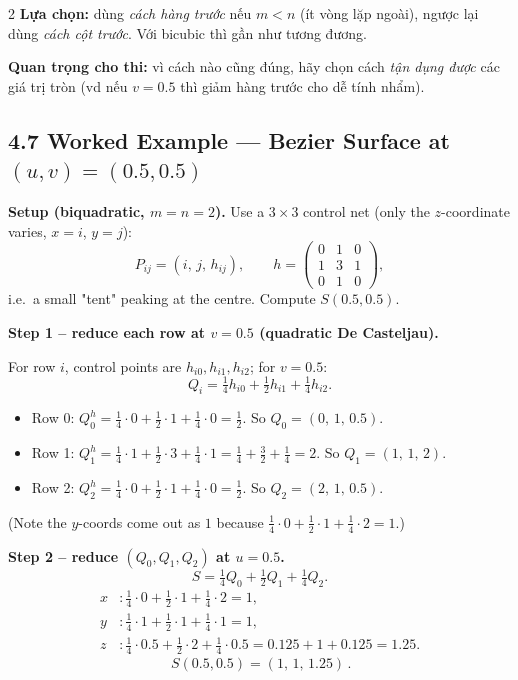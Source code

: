 \begin{paracol}{2}
\medskip
\textbf{Lựa chọn:} dùng \emph{cách hàng trước} nếu $m<n$ (ít vòng lặp ngoài), ngược lại dùng \emph{cách cột trước}. Với bicubic thì gần như tương đương.

\medskip
\textbf{Quan trọng cho thi:} vì cách nào cũng đúng, hãy chọn cách \emph{tận dụng được} các giá trị tròn (vd nếu $v=0.5$ thì giảm hàng trước cho dễ tính nhẩm).

\switchcolumn*

\subsection*{4.7 Worked Example --- Bezier Surface at $(u,v)=(0.5,0.5)$}

\textbf{Setup (biquadratic, $m=n=2$).} Use a $3\times 3$ control net (only the $z$-coordinate varies, $x=i$, $y=j$):
\[
P_{ij}=(i,\,j,\,h_{ij}),\qquad h=\begin{pmatrix}0&1&0\\1&3&1\\0&1&0\end{pmatrix},
\]
i.e.\ a small "tent" peaking at the centre. Compute $S(0.5,0.5)$.

\medskip
\textbf{Step 1 -- reduce each row at $v=0.5$ (quadratic De Casteljau).}

For row $i$, control points are $h_{i0},h_{i1},h_{i2}$; for $v=0.5$:
\[
Q_i = \tfrac14 h_{i0}+\tfrac12 h_{i1}+\tfrac14 h_{i2}.
\]
\begin{itemize}[leftmargin=*,nosep]
  \item Row 0: $Q_0^h=\tfrac14\cdot0+\tfrac12\cdot1+\tfrac14\cdot0=\tfrac12$. So $Q_0=(0,\,1,\,0.5)$.
  \item Row 1: $Q_1^h=\tfrac14\cdot1+\tfrac12\cdot3+\tfrac14\cdot1=\tfrac14+\tfrac32+\tfrac14=2$. So $Q_1=(1,\,1,\,2)$.
  \item Row 2: $Q_2^h=\tfrac14\cdot0+\tfrac12\cdot1+\tfrac14\cdot0=\tfrac12$. So $Q_2=(2,\,1,\,0.5)$.
\end{itemize}
(Note the $y$-coords come out as $1$ because $\tfrac14\cdot 0+\tfrac12\cdot 1+\tfrac14\cdot 2=1$.)

\textbf{Step 2 -- reduce $(Q_0,Q_1,Q_2)$ at $u=0.5$.}
\[
S=\tfrac14 Q_0+\tfrac12 Q_1+\tfrac14 Q_2.
\]
\begin{align*}
x &: \tfrac14\cdot 0+\tfrac12\cdot 1+\tfrac14\cdot 2 = 1,\\
y &: \tfrac14\cdot 1+\tfrac12\cdot 1+\tfrac14\cdot 1 = 1,\\
z &: \tfrac14\cdot 0.5+\tfrac12\cdot 2+\tfrac14\cdot 0.5 = 0.125+1+0.125=1.25.
\end{align*}
\[
\boxed{\,S(0.5,0.5)=(1,\,1,\,1.25)\,}.
\]


\end{paracol}
